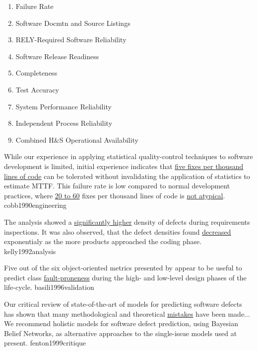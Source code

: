 \documentclass{article}
\begin{document}
{\begin{pptWide}{3}
\begin{enumerate}
  \item Failure Rate
  \item Software Docmtn and Source Listings
  \item RELY-Required Software Reliability
  \item Software Release Readiness
  \item Completeness
  \item Test Accuracy
  \item System Performance Reliability
  \item Independent Process Reliability
  \item Combined H\&S Operational Availability
  \end{enumerate}
  \end{pptWide}
  }


  {While our experience in applying statistical quality-control techniques to software development is limited, initial experience indicates that \ul{five fixes per thousand lines of code} can be tolerated without invalidating the application of statistics to estimate MTTF. This failure rate is low compared to normal development practices, where \ul{20 to 60} fixes per thousand lines of code is \ul{not atypical}.}
  {cobb1990engineering}

  {The analysis showed a \ul{significantly higher} density of defects during requirements inspections. It was also observed, that the defect densities found \ul{decreased} exponentialy as the more products approached the coding phase.}
  {kelly1992analysis}

  {Five out of the six object-oriented metrics presented by \citet{chidamber1994metrics} appear to be useful to predict class \ul{fault-proneness} during the high- and low-level design phases of the life-cycle.}
  {basili1996validation}

  {Our critical review of state-of-the-art of models for predicting software defects has shown that many methodological and theoretical \ul{mistakes} have been made... We recommend holistic models for software defect prediction, using Bayesian Belief Networks, as alternative approaches to the single-issue models used at present.}
  {fenton1999critique}
\end{document}
